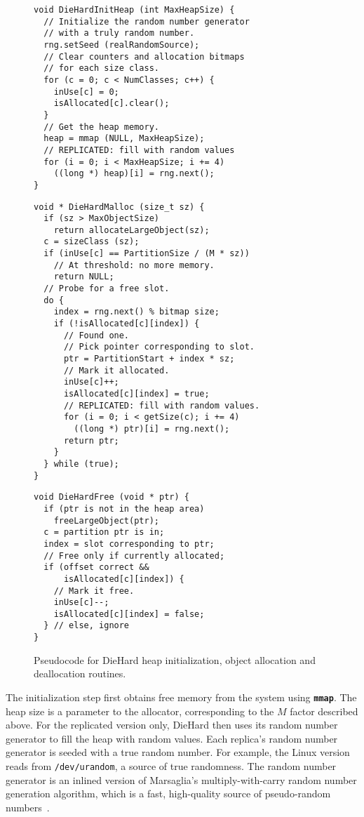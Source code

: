 \documentclass{sig-alternate}
\newcommand{\cfunction}[1]{{\bf \tt #1}}
\newcommand{\mmap}{\cfunction{mmap}}
\begin{document}
\begin{figure}[!t]
\begin{lstlisting}
void DieHardInitHeap (int MaxHeapSize) {
  // Initialize the random number generator
  // with a truly random number.
  rng.setSeed (realRandomSource);
  // Clear counters and allocation bitmaps
  // for each size class.
  for (c = 0; c < NumClasses; c++) {
    inUse[c] = 0;
    isAllocated[c].clear();
  }
  // Get the heap memory.
  heap = mmap (NULL, MaxHeapSize);
  // REPLICATED: fill with random values
  for (i = 0; i < MaxHeapSize; i += 4)
    ((long *) heap)[i] = rng.next();
}
\end{lstlisting}
\begin{lstlisting}
void * DieHardMalloc (size_t sz) {
  if (sz > MaxObjectSize)
    return allocateLargeObject(sz);
  c = sizeClass (sz);
  if (inUse[c] == PartitionSize / (M * sz))
    // At threshold: no more memory.
    return NULL;
  // Probe for a free slot.
  do {
    index = rng.next() % bitmap size;
    if (!isAllocated[c][index]) {
      // Found one.
      // Pick pointer corresponding to slot.
      ptr = PartitionStart + index * sz;
      // Mark it allocated.
      inUse[c]++;
      isAllocated[c][index] = true;
      // REPLICATED: fill with random values.
      for (i = 0; i < getSize(c); i += 4)
        ((long *) ptr)[i] = rng.next();
      return ptr;
    }
  } while (true);
}
\end{lstlisting}
\begin{lstlisting}
void DieHardFree (void * ptr) {
  if (ptr is not in the heap area)
    freeLargeObject(ptr);
  c = partition ptr is in;
  index = slot corresponding to ptr;
  // Free only if currently allocated;
  if (offset correct && 
      isAllocated[c][index]) {
    // Mark it free.
    inUse[c]--;
    isAllocated[c][index] = false;
  } // else, ignore
}
\end{lstlisting}
\caption{Pseudocode for DieHard heap initialization, object allocation and deallocation routines.}
\end{figure}

\noindent
The initialization step first obtains free memory from the system
using \mmap{}. The heap size is a parameter to the allocator,
corresponding to the $M$ factor described above. For the replicated
version only, DieHard then uses its random number generator to fill
the heap with random values. Each replica's random number generator is
seeded with a true random number. For example, the Linux version reads
from {\tt /dev/urandom}, a source of true randomness. The random
number generator is an inlined version of Marsaglia's
multiply-with-carry random number generation algorithm, which is a
fast, high-quality source of pseudo-random numbers~\cite{marsaglia94}.
\end{document}
